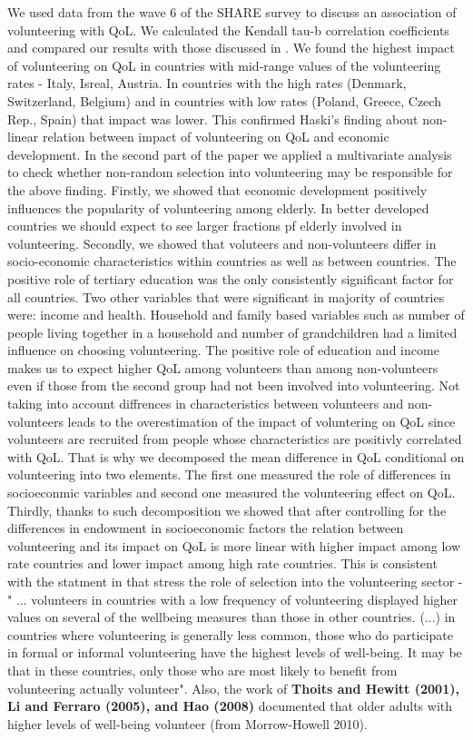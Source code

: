 \documentclass[10pt, letterpaper]{article}
\begin{document}
\begin{spacing}{1.4}
We used data from the wave 6 of the SHARE survey to discuss an association of volunteering with QoL. We calculated the Kendall tau-b correlation coefficients and compared  our results with those discussed in \citet{haski09}. We found the highest impact of volunteering on QoL in countries with mid-range values of the volunteering rates - Italy, Isreal, Austria. In countries with the high rates (Denmark, Switzerland, Belgium) and in countries with low rates (Poland, Greece, Czech Rep., Spain) that impact was lower. This confirmed Haski's finding about non-linear relation between impact of volunteering on QoL and economic development. 
In the second part of the paper we applied a multivariate analysis to check whether non-random selection into volunteering may be responsible for the above finding. Firstly, we showed that economic development positively influences the popularity of volunteering among elderly. In better developed countries we should expect to see larger fractions pf elderly involved in volunteering. Secondly, we showed that voluteers and non-volunteers differ in socio-economic characteristics within countries as well as between countries. The positive role of tertiary education was the only consistently significant factor for all countries. Two other variables that were significant in majority of countries were: income and health. Household and family based variables such as number of people living together in a household and number of grandchildren had a limited influence on choosing volunteering. The positive role of education and income makes us to expect higher QoL among volunteers than among non-volunteers even if those from the second group had not been involved into volunteering. Not taking into account diffrences in characteristics between volunteers and non-volunteers leads to the overestimation of the impact of voluntering on QoL since volunteers are recruited from people whose characteristics are positivly correlated with QoL. That is why we decomposed the mean difference in QoL conditional on volunteering into two elements. The first one measured the role of differences in socioeconmic variables and second one measured the  volunteering effect on QoL. Thirdly, thanks to such decomposition we showed that after controlling for the differences in endowment in socioeconomic factors the relation between  volunteering and its impact on QoL is more linear with higher impact among low rate countries and lower impact among high rate countries. This is consistent with the statment in \citet{plagnol10} that stress the role of selection into the volunteering sector - " ... volunteers in countries with a low frequency of volunteering displayed higher values on several of the wellbeing measures than those in other countries. (...) in countries where volunteering is generally less common, those who do participate in formal or informal volunteering have the highest levels of well-being. It may be that in these countries, only those who are most likely to benefit from volunteering actually volunteer". Also, the work of \textbf{Thoits and Hewitt (2001), Li and Ferraro (2005), and Hao (2008)} documented that older adults with higher levels of well-being volunteer (from Morrow-Howell 2010).

\end{spacing}
\end{document}
